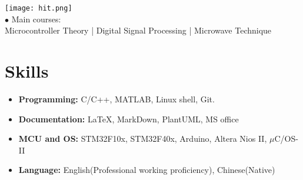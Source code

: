 \documentclass[12pt,a4paper,sans]{moderncv}        %
\begin{document}
\texttt{[image: hit.png]} \vspace{-25pt}\\
\hspace*{1.3cm}
{
\hspace*{1cm} $\bullet$ Main courses: \\
\hspace*{1.3cm} Microcontroller Theory | Digital Signal Processing | Microwave Technique 
}  %







\section{Skills}

\vspace{3pt}

\begin{itemize}

\item \textbf{Programming:} C/C++, MATLAB, Linux shell, Git.

\vspace{6pt}

\item \textbf{Documentation:} \LaTeX , MarkDown, PlantUML, MS office

\vspace{6pt}

\item \textbf{MCU and OS:}  STM32F10x, STM32F40x, Arduino, Altera Nios II, $\mu$C/OS-II

\vspace{6pt}

\item \textbf{Language:} English(Professional working proficiency), Chinese(Native)

\vspace{6pt}

\end{itemize}



\nocite{*}

\end{document}
